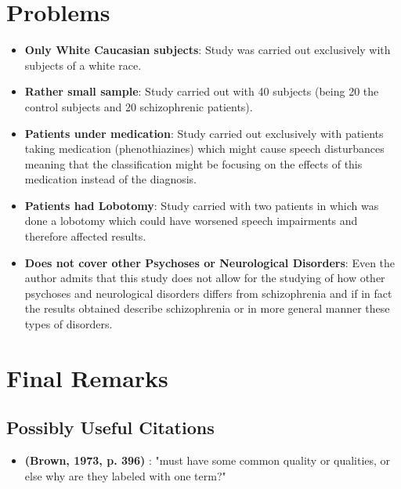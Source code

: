 \documentclass{Paper_Summary}
\begin{document}
\section{Problems}
    \begin{itemize}
        \item \textbf{Only White Caucasian subjects}: Study was carried out exclusively with subjects of a white race.
        \item \textbf{Rather small sample}: Study carried out with 40 subjects (being 20 the control subjects and 20 schizophrenic patients).
        \item \textbf{Patients under medication}: Study carried out exclusively with patients taking medication (phenothiazines) which might cause speech disturbances meaning that the classification might be focusing on the effects of this medication instead of the diagnosis.
        \item \textbf{Patients had Lobotomy}: Study carried with two patients in which was done a lobotomy which could have worsened speech impairments and therefore affected results.
        \item \textbf{Does not cover other Psychoses or Neurological Disorders}: Even the author admits that this study does not allow for the studying of how other psychoses and neurological disorders differs from schizophrenia and if in fact the results obtained describe schizophrenia or in more general manner these types of disorders.
    \end{itemize}


\section{Final Remarks}

\breakline

\begin{center}
    \section*{Possibly Useful Citations}
\end{center}

    \begin{itemize}
        \item \textbf{(Brown, 1973, p. 396)} : "must have some common quality or qualities, or else why are they labeled with one term?"
    \end{itemize}
\end{document}
